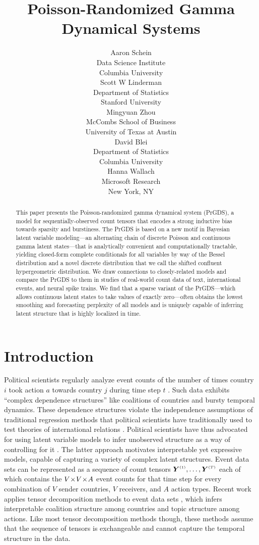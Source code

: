 \documentclass{article}
\title{Poisson-Randomized Gamma Dynamical Systems}
\author{%
  Aaron Schein \\
  Data Science Institute\\
  Columbia University\\
  \And
  Scott W Linderman \\
  Department of Statistics\\
  Stanford University\\
  \AND
  Mingyuan Zhou \\
  McCombs School of Business\\
  University of Texas at Austin\\
  \And
  David Blei \\
  Department of Statistics\\
  Columbia University\\
  \And
  Hanna Wallach \\
  Microsoft Research\\
  New York, NY\\
}
\begin{document}
\maketitle

\begin{abstract}
This paper presents the Poisson-randomized gamma dynamical system (PrGDS), a model for sequentially-observed count tensors that encodes a strong inductive bias towards sparsity and burstiness. The PrGDS is based on a new motif in Bayesian latent variable modeling---an alternating chain of discrete Poisson and continuous gamma latent states---that is analytically convenient and computationally tractable, yielding closed-form complete conditionals for all variables by way of the Bessel distribution and a novel discrete distribution that we call the shifted confluent hypergeometric distribution. We draw connections to closely-related models and compare the PrGDS to them in studies of real-world count data of text, international events, and neural spike trains. We find that a sparse variant of the PrGDS---which allows continuous latent states to take values of exactly zero---often obtains the lowest smoothing and forecasting perplexity of all models and is uniquely capable of inferring latent structure that is highly localized in time.~
\end{abstract}

\section{Introduction}

Political scientists regularly analyze event counts of the number of times country $i$ took action $a$ towards country $j$ during time step $t$ \cite{schrodt1995event}. Such data exhibits ``complex dependence structures'' \citep{king2001proper} like coalitions of countries and bursty temporal dynamics. These dependence structures violate the independence assumptions of traditional regression methods that political scientists have traditionally used to test theories of international relations \cite{green2001dirty,poast2010mis,erikson2014dyadic}. Political scientists have thus advocated for using latent variable models to infer unobserved structure as a way of controlling for it \cite{stewart2014latent}. The latter approach motivates interpretable yet expressive models, capable of capturing a variety of complex latent structures. Event data sets can be represented as a sequence of count tensors $\Yten^{\mathsmaller{(1)}},\dots,\Yten^{\mathsmaller{(T)}}$ each of which contains the $V \!\times\! V \!\times\! A$ event counts for that time step for every combination of $V$ sender countries, $V$ receivers, and $A$ action types. Recent work applies tensor decomposition methods to event data sets \cite{hoff2004modeling,hoff2015multilinear,schein2015bayesian,hoff2016equivariant,schein2016bayesian}, which infers interpretable coalition structure among countries and topic structure among actions. Like most tensor decomposition methods though, these methods assume that the sequence of tensors is exchangeable and cannot capture the temporal structure in the data.~  
\end{document}
